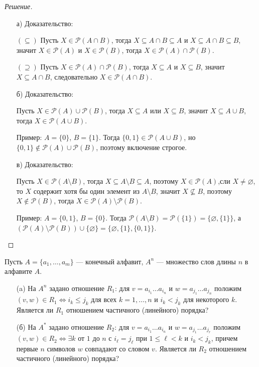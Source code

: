 \documentclass{article}
\begin{document}
\begin{proof}[Решение]\
\begin{enumerate}
    \item[а)] Доказательство:
    
    $(\subseteq)$ Пусть $X \in \mathcal{P}(A \cap B)$, тогда $X \subseteq A \cap B \subseteq A$ и $X \subseteq A \cap B \subseteq B$, значит $X \in \mathcal{P}(A)$ и $X \in \mathcal{P}(B)$, тогда $X \in \mathcal{P}(A) \cap \mathcal{P}(B)$.
    
    $(\supseteq)$ Пусть $X \in \mathcal{P}(A) \cap \mathcal{P}(B)$, тогда $X \subseteq A$ и $X \subseteq B$, значит $X \subseteq A \cap B$, следовательно $X \in \mathcal{P}(A \cap B)$.
    
    \item[б)] Доказательство:
    
    Пусть $X \in \mathcal{P}(A) \cup \mathcal{P}(B)$, тогда $X \subseteq A$ или $X \subseteq B$, значит $X \subseteq A \cup B$, тогда $X \in \mathcal{P}(A \cup B)$.
    
     Пример: $A = \{0\}$, $B = \{1\}$. Тогда $\{0,1\} \in \mathcal{P}(A \cup B)$, но $\{0,1\} \notin \mathcal{P}(A) \cup \mathcal{P}(B)$, поэтому включение строгое.
    
    \item[в)] Доказательство:
    
    Пусть $X \in \mathcal{P}(A \setminus B)$, тогда $X \subseteq A \setminus B \subseteq A$, поэтому $X \in \mathcal{P}(A)$,сли $X \neq \varnothing$, то $X$ содержит хотя бы один элемент из $A \setminus B$, значит $X \not\subseteq B$, поэтому $X \notin \mathcal{P}(B)$, тогда $X \in \mathcal{P}(A) \setminus \mathcal{P}(B)$.
    
    Пример: $A = \{0,1\}$, $B = \{0\}$. Тогда $\mathcal{P}(A \setminus B) = \mathcal{P}(\{1\}) = \{\varnothing, \{1\}\}$, а $(\mathcal{P}(A) \setminus \mathcal{P}(B)) \cup \{\varnothing\} = \{\varnothing, \{1\}, \{0,1\}\}$.
\end{enumerate}
\end{proof}

\begin{task}[3]
Пусть $A = \{a_1, \ldots, a_m\}$ — конечный алфавит, $A^n$ — множество слов длины $n$ в алфавите $A$.
\begin{enumerate}
    \item[(a)] На $A^n$ задано отношение $R_1$: для $v = a_{i_1}\ldots a_{i_n}$ и $w = a_{j_1}\ldots a_{j_n}$ положим $(v,w)\in R_1 \iff i_k\le j_k$ для всех $k=1,\dots,n$ и $i_k<j_k$ для некоторого $k$. Является ли $R_1$ отношением частичного (линейного) порядка?
    \item[(б)] На $A^*$ задано отношение $R_2$: для $v = a_{i_1}\ldots a_{i_n}$ и $w = a_{j_1}\ldots a_{j_r}$ положим $(v,w)\in R_2 \iff \exists k$ от $1$ до $n$ с $i_\ell=j_\ell$ при $1\le \ell<k$ и $i_k<j_k$, причем первые $n$ символов $w$ совпадают со словом $v$. Является ли $R_2$ отношением частичного (линейного) порядка?
\end{enumerate}
\end{task}
\end{document}
